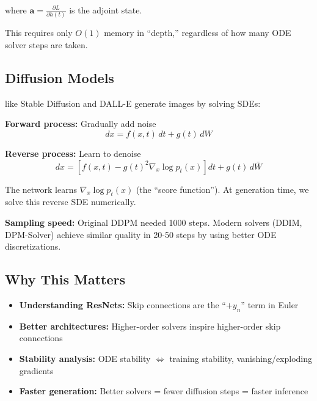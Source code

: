 where $\mathbf{a} = \frac{\partial L}{\partial h(t)}$ is the adjoint state.


This requires only $O(1)$ memory in ``depth,'' regardless of how many ODE solver steps are taken.


\subsection{Diffusion Models}

 like Stable Diffusion and DALL-E generate images by solving SDEs:

\textbf{Forward process:} Gradually add noise
\begin{equation}
    dx = f(x,t)\,dt + g(t)\,dW
\end{equation}

\textbf{Reverse process:} Learn to denoise
\begin{equation}
    dx = \left[f(x,t) - g(t)^2 \nabla_x \log p_t(x)\right]dt + g(t)\,d\bar{W}
\end{equation}


The network learns $\nabla_x \log p_t(x)$ (the ``score function''). At generation time, we solve this reverse SDE numerically.

\textbf{Sampling speed:} Original DDPM needed 1000 steps. Modern solvers (DDIM, DPM-Solver) achieve similar quality in 20-50 steps by using better ODE discretizations.


\subsection{Why This Matters}

\begin{itemize}
    \item \textbf{Understanding ResNets:} Skip connections are the ``$+y_n$'' term in Euler
    \item \textbf{Better architectures:} Higher-order solvers inspire higher-order skip connections
    \item \textbf{Stability analysis:} ODE stability $\Leftrightarrow$ training stability, vanishing/exploding gradients
    \item \textbf{Faster generation:} Better solvers = fewer diffusion steps = faster inference
\end{itemize}




